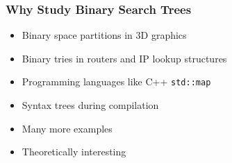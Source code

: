 \documentclass{beamer}
\theoremstyle{plain}
\begin{document}
\iffalse

\begin{frame} \frametitle{Why Study Binary Search Trees}


\begin{itemize}
\item AVL trees self-balancing BST in 1963, maintains $O(\lg(n))$ height \cite{adelsonvelskii1963algorithm}

\item B-trees/Red-black trees by R. Bayer in 1972 (with later extensions by others) \cite{bayer1972symmetric}

\item  Allen and Munro examined a MTR heuristic \cite{allen1978self}

\item Splay trees of Sleator and Tarjan in 1985, dynamic optimality conjecture \cite{sleator1985self}

\item Tango trees in 2007 by Demaine et al., $O(\lg \lg n)$-competitive \cite{demaine2007dynamic}

\end{itemize}

\end{frame}
\fi

\begin{frame} \frametitle{Why Study Binary Search Trees}

\begin{itemize}

\item Binary space partitions in 3D graphics \cite{schumacker1969study, paterson1992optimal}

\item Binary tries in routers and IP lookup structures \cite{song2010building}

\item Programming languages like C++ \texttt{std::map} \cite{CppMap} 

\item Syntax trees during compilation \cite{louden1997compiler}

\item Many more examples

\item Theoretically interesting

\end{itemize}

\end{frame}
\end{document}
